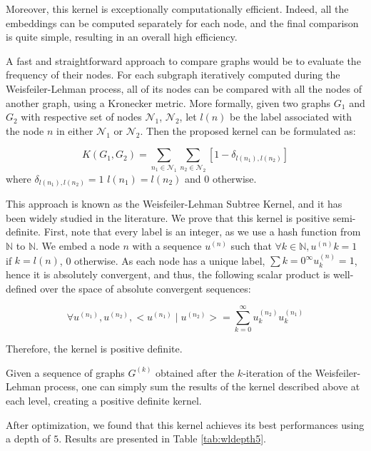 \documentclass{IEEEtran}
\begin{document}
Moreover, this kernel is exceptionally computationally efficient.
Indeed, all the embeddings can be computed separately for each node,
and the final comparison is quite simple,
resulting in an overall high efficiency.

A fast and straightforward approach to compare graphs would be to evaluate the frequency of their nodes.
For each subgraph iteratively computed during the Weisfeiler-Lehman process,
all of its nodes can be compared with all the nodes of another graph,
using a Kronecker metric.
More formally, given two graphs $G_1$ and $G_2$
with respective set of nodes $\mathcal{N}_1$, $\mathcal{N}_2$, let $l(n)$
be the label associated with the node $n$ in either $\mathcal{N}_1$ or $\mathcal{N}_2$.
Then the proposed kernel can be formulated as:

\begin{equation*}
    K(G_1, G_2) = \sum_{n_1 \in \mathcal{N}_1} \sum_{n_2 \in \mathcal{N}_2} [1 - \delta_{l(n_1), l(n_2)}]
\end{equation*}
where $\delta_{l(n_1), l(n_2)} = 1$  $l(n_1) = l(n_2)$ and $0$ otherwise.

This approach is known as the Weisfeiler-Lehman Subtree Kernel, and it has been widely studied in the literature.
We prove that this kernel is positive semi-definite.
First, note that every label is an integer,
as we use a hash function from $\mathbb N $ to $\mathbb N $.
We embed a node $n$ with a sequence $u^{(n)}$ such that
$\forall k \in \mathbb{N}, u^{(n)}k = 1$ if $k = l(n)$, 0 otherwise.
As each node has a unique label, $\sum{k=0}^\infty u^{(n)}_k = 1$,
hence it is absolutely convergent, and thus, the following scalar product is well-defined over the space of absolute convergent sequences:

\begin{equation*}
    \forall u^{(n_1)}, u^{(n_2)}, < u^{(n_1)} \; | \; u^{(n_2)} > =
    \sum_{k=0}^\infty u^{(n_2)}_k u^{(n_1)}_k
\end{equation*}

Therefore, the kernel is positive definite.

Given a sequence of graphs $G^{(k)}$ obtained after the $k$-iteration of the Weisfeiler-Lehman process,
one can simply sum the results of the kernel described above at each level, creating a positive definite kernel.

After optimization, we found that this kernel achieves its best performances using a depth of $5$.
Results are presented in Table \ref{tab:wldepth5}.
\end{document}
